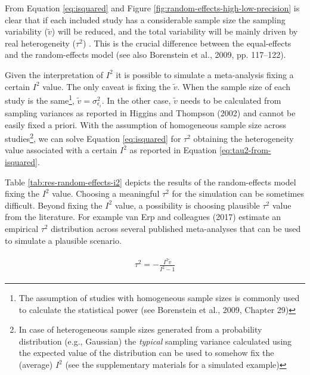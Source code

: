 \documentclass[
  man,floatsintext]{apa6}
\begin{document}
From Equation \eqref{eq:isquared} and Figure \ref{fig:random-effects-high-low-precision} is clear that if each included study has a considerable sample size the sampling variability (\(\tilde{v}\)) will be reduced, and the total variability will be mainly driven by real heterogeneity (\(\tau^2\)) . This is the crucial difference between the equal-effects and the random-effects model (see also Borenstein et al., 2009, pp. 117--122).

Given the interpretation of \(I^{2}\) it is possible to simulate a meta-analysis fixing a certain \(I^{2}\) value. The only caveat is fixing the \(\tilde{v}\). When the sample size of each study is the same\footnote{ The assumption of studies with homogeneous sample sizes is commonly used to calculate the statistical power (see Borenstein et al., 2009, Chapter 29)}, \(\tilde{v} = \sigma_{\epsilon_i}^{2}\). In the other case, \(\tilde{v}\) needs to be calculated from sampling variances as reported in Higgins and Thompson (2002) and cannot be easily fixed a priori. With the assumption of homogeneous sample size across studies\footnote{In case of heterogeneous sample sizes generated from a probability distribution (e.g., Gaussian) the \emph{typical} sampling variance calculated using the expected value of the distribution can be used to somehow fix the (average) \(I^2\) (see the supplementary materials for a simulated example)}, we can solve Equation \eqref{eq:isquared} for \(\tau^{2}\) obtaining the heterogeneity value associated with a certain \(I^{2}\) as reported in Equation \eqref{eq:tau2-from-isquared}.

Table \ref{tab:res-random-effects-i2} depicts the results of the random-effects model fixing the \(I^{2}\) value. Choosing a meaningful \(\tau^2\) for the simulation can be sometimes difficult. Beyond fixing the \(I^2\) value, a possibility is choosing plausible \(\tau^2\) value from the literature. For example van Erp and colleagues (2017) estimate an empirical \(\tau^2\) distribution across several published meta-analyses that can be used to simulate a plausible scenario.

\begin{align}
\begin{gathered}
\tau^2 = - \frac{I^2\tilde{v}}{I^2 - 1}
\label{eq:tau2-from-isquared}
\end{gathered}
\end{align}

\scriptsize
\end{document}
